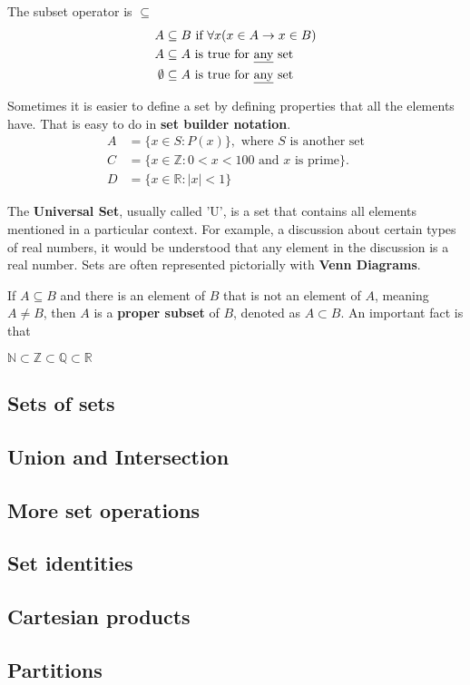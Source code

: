 The subset operator is \(\subseteq\)
\begin{align*}
  A         & \subseteq B \text{  if } \forall x (x \in A \rightarrow x \in B) \\
  A         & \subseteq A \text{  is true for \underline{any} set}             \\
  \emptyset & \subseteq A \text{ is true for \underline{any} set}
\end{align*}

Sometimes it is easier to define a set by defining properties that all the elements have.
That is easy to do in \textbf{set builder notation}.
\begin{align*}
  A & = \{x \in S: P(x)\}, \text{ where \(S\) is another set}              \\
  C & = \{x \in \mathbb{Z}: 0 < x < 100 \text{ and } x \text{ is prime}\}. \\
  D & = \{x \in \mathbb{R}: \left\lvert x\right\rvert < 1\}
\end{align*}

The \textbf{Universal Set}, usually called 'U', is a set that contains all elements mentioned in a particular context.
For example, a discussion about certain types of real numbers, it would be understood that any element in the discussion
is a real number. Sets are often represented pictorially with \textbf{Venn Diagrams}.

\begin{center}
\end{center}

If \(A \subseteq B\) and there is an element of $B$ that is not an element of $A$, meaning \(A \not = B\),
then $A$ is a \textbf{proper subset} of $B$, denoted as \(A \subset B\). An important fact is that
\begin{center}
  \(\mathbb{N} \subset \mathbb{Z} \subset \mathbb{Q} \subset \mathbb{R}\)
\end{center}

\subsection{Sets of sets}
\subsection{Union and Intersection}
\subsection{More set operations}
\subsection{Set identities}
\subsection{Cartesian products}
\subsection{Partitions}
